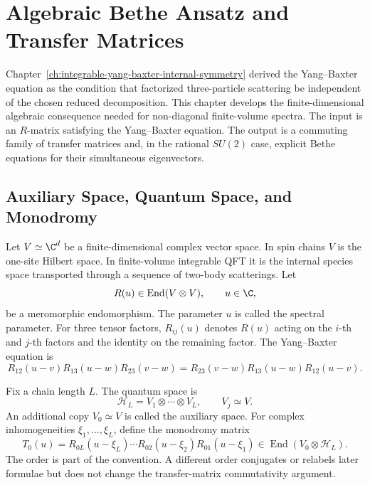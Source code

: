 \chapter{Algebraic Bethe Ansatz and Transfer Matrices}
\label{ch:integrable-algebraic-bethe-ansatz-transfer-matrices}

\ConventionsLorentzian

Chapter~\ref{ch:integrable-yang-baxter-internal-symmetry} derived the
Yang--Baxter equation as the condition that factorized three-particle
scattering be independent of the chosen reduced decomposition.  This chapter
develops the finite-dimensional algebraic consequence needed for non-diagonal
finite-volume spectra.  The input is an \(R\)-matrix satisfying the
Yang--Baxter equation.  The output is a commuting family of transfer matrices
and, in the rational \(SU(2)\) case, explicit Bethe equations for their
simultaneous eigenvectors.

\section{Auxiliary Space, Quantum Space, and Monodromy}

Let \(V\simeq\C^d\) be a finite-dimensional complex vector space.  In spin
chains \(V\) is the one-site Hilbert space.  In finite-volume integrable QFT it
is the internal species space transported through a sequence of two-body
scatterings.  Let
\[
  R(u)\in \operatorname{End}(V\otimes V),\qquad u\in\C ,
\]
be a meromorphic endomorphism.  The parameter \(u\) is called the spectral
parameter.  For three tensor factors, \(R_{ij}(u)\) denotes \(R(u)\) acting on
the \(i\)-th and \(j\)-th factors and the identity on the remaining factor.
The Yang--Baxter equation is
\begin{equation}
  R_{12}(u-v)R_{13}(u-w)R_{23}(v-w)
  =
  R_{23}(v-w)R_{13}(u-w)R_{12}(u-v).
  \label{eq:aba-ybe-difference-form}
\end{equation}

Fix a chain length \(L\).  The quantum space is
\[
  \mathcal H_L=V_1\otimes\cdots\otimes V_L,\qquad V_j\simeq V .
\]
An additional copy \(V_0\simeq V\) is called the auxiliary space.  For complex
inhomogeneities \(\xi_1,\ldots,\xi_L\), define the monodromy matrix
\begin{equation}
  T_0(u)
  =
  R_{0L}(u-\xi_L)\cdots R_{02}(u-\xi_2)R_{01}(u-\xi_1)
  \in \operatorname{End}(V_0\otimes\mathcal H_L).
  \label{eq:aba-monodromy}
\end{equation}
The order is part of the convention.  A different order conjugates or
relabels later formulae but does not change the transfer-matrix commutativity
argument.


